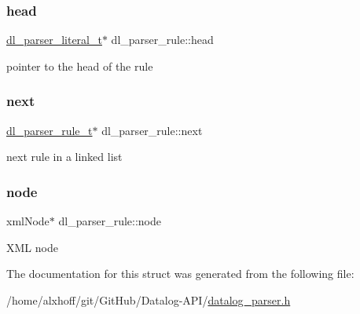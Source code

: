 \subsubsection{\texorpdfstring{head}{head}}
{\footnotesize\ttfamily \hyperlink{datalog__parser_8h_adaef2eede58b9f7698925f7194af1373}{dl\+\_\+parser\+\_\+literal\+\_\+t}$\ast$ dl\+\_\+parser\+\_\+rule\+::head}

pointer to the head of the rule \mbox{\label{structdl__parser__rule_a8cd9d240d0c0376f0613b84266b64eac}} 
\subsubsection{\texorpdfstring{next}{next}}
{\footnotesize\ttfamily \hyperlink{datalog__parser_8h_a8024697b9e41c6c143acefaaf5d047cd}{dl\+\_\+parser\+\_\+rule\+\_\+t}$\ast$ dl\+\_\+parser\+\_\+rule\+::next}

next rule in a linked list \mbox{\label{structdl__parser__rule_ab1344f0e0e232256a9de89baaf709466}} 
\subsubsection{\texorpdfstring{node}{node}}
{\footnotesize\ttfamily xml\+Node$\ast$ dl\+\_\+parser\+\_\+rule\+::node}

X\+ML node 

The documentation for this struct was generated from the following file\+:\begin{DoxyCompactItemize}
\item 
/home/alxhoff/git/\+Git\+Hub/\+Datalog-\/\+A\+P\+I/\hyperlink{datalog__parser_8h}{datalog\+\_\+parser.\+h}\end{DoxyCompactItemize}
